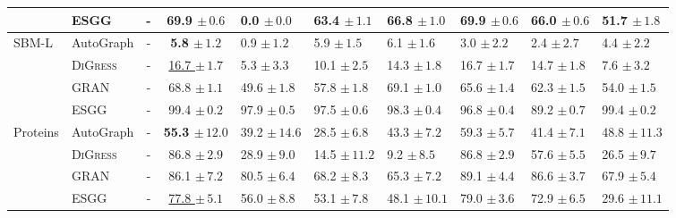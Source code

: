\begin{tabular}{llccp{1.6cm}p{1.6cm}p{1.6cm}p{1.6cm}p{1.6cm}p{1.6cm}}
 & ESGG & - & 69.9 $\pm\,\scriptstyle{0.6}$ & 0.0 $\pm\,\scriptstyle{0.0}$ & 63.4 $\pm\,\scriptstyle{1.1}$ & 66.8 $\pm\,\scriptstyle{1.0}$ & 69.9 $\pm\,\scriptstyle{0.6}$ & 66.0 $\pm\,\scriptstyle{0.6}$ & 51.7 $\pm\,\scriptstyle{1.8}$ \\
\midrule
\textsc{SBM-L} & AutoGraph & - & \textbf{5.8 $\pm\,\scriptstyle{1.2}$} & 0.9 $\pm\,\scriptstyle{1.2}$ & 5.9 $\pm\,\scriptstyle{1.5}$ & 6.1 $\pm\,\scriptstyle{1.6}$ & 3.0 $\pm\,\scriptstyle{2.2}$ & 2.4 $\pm\,\scriptstyle{2.7}$ & 4.4 $\pm\,\scriptstyle{2.2}$ \\
 & \textsc{DiGress} & - & \underline{16.7 $\pm\,\scriptstyle{1.7}$} & 5.3 $\pm\,\scriptstyle{3.3}$ & 10.1 $\pm\,\scriptstyle{2.5}$ & 14.3 $\pm\,\scriptstyle{1.8}$ & 16.7 $\pm\,\scriptstyle{1.7}$ & 14.7 $\pm\,\scriptstyle{1.8}$ & 7.6 $\pm\,\scriptstyle{3.2}$ \\
 & GRAN & - & 68.8 $\pm\,\scriptstyle{1.1}$ & 49.6 $\pm\,\scriptstyle{1.8}$ & 57.8 $\pm\,\scriptstyle{1.8}$ & 69.1 $\pm\,\scriptstyle{1.0}$ & 65.6 $\pm\,\scriptstyle{1.4}$ & 62.3 $\pm\,\scriptstyle{1.5}$ & 54.0 $\pm\,\scriptstyle{1.5}$ \\
 & ESGG & - & 99.4 $\pm\,\scriptstyle{0.2}$ & 97.9 $\pm\,\scriptstyle{0.5}$ & 97.5 $\pm\,\scriptstyle{0.6}$ & 98.3 $\pm\,\scriptstyle{0.4}$ & 96.8 $\pm\,\scriptstyle{0.4}$ & 89.2 $\pm\,\scriptstyle{0.7}$ & 99.4 $\pm\,\scriptstyle{0.2}$ \\
\midrule
Proteins & AutoGraph & - & \textbf{55.3 $\pm\,\scriptstyle{12.0}$} & 39.2 $\pm\,\scriptstyle{14.6}$ & 28.5 $\pm\,\scriptstyle{6.8}$ & 43.3 $\pm\,\scriptstyle{7.2}$ & 59.3 $\pm\,\scriptstyle{5.7}$ & 41.4 $\pm\,\scriptstyle{7.1}$ & 48.8 $\pm\,\scriptstyle{11.3}$ \\
 & \textsc{DiGress} & - & 86.8 $\pm\,\scriptstyle{2.9}$ & 28.9 $\pm\,\scriptstyle{9.0}$ & 14.5 $\pm\,\scriptstyle{11.2}$ & 9.2 $\pm\,\scriptstyle{8.5}$ & 86.8 $\pm\,\scriptstyle{2.9}$ & 57.6 $\pm\,\scriptstyle{5.5}$ & 26.5 $\pm\,\scriptstyle{9.7}$ \\
 & GRAN & - & 86.1 $\pm\,\scriptstyle{7.2}$ & 80.5 $\pm\,\scriptstyle{6.4}$ & 68.2 $\pm\,\scriptstyle{8.3}$ & 65.3 $\pm\,\scriptstyle{7.2}$ & 89.1 $\pm\,\scriptstyle{4.4}$ & 86.6 $\pm\,\scriptstyle{3.7}$ & 67.9 $\pm\,\scriptstyle{5.4}$ \\
 & ESGG & - & \underline{77.8 $\pm\,\scriptstyle{5.1}$} & 56.0 $\pm\,\scriptstyle{8.8}$ & 53.1 $\pm\,\scriptstyle{7.8}$ & 48.1 $\pm\,\scriptstyle{10.1}$ & 79.0 $\pm\,\scriptstyle{3.6}$ & 72.9 $\pm\,\scriptstyle{6.5}$ & 29.6 $\pm\,\scriptstyle{11.1}$ \\
\bottomrule
\end{tabular}